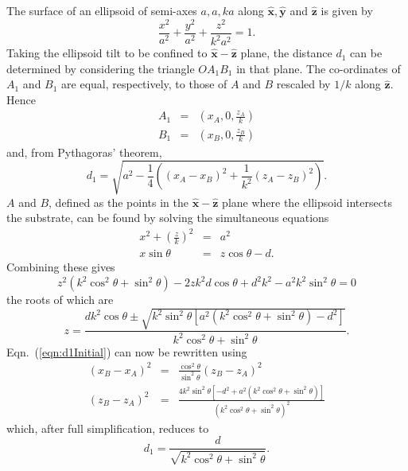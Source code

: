 \documentclass[aps,10pt,twocolumn]{revtex4}
\newcommand{\vecth}[1]{ \mathbf{\hat{#1} } }
\newcommand{\lp}{\left(}
\newcommand{\rp}{\right)}
\begin{document}
The surface of an ellipsoid of semi-axes $a,a,ka$ along $\vecth{x},\vecth{y}$ and $\vecth{z}$ is given by
\begin{equation}
    \frac{x^2}{a^2} + \frac{y^2}{a^2} + \frac{z^2}{k^2a^2} = 1 .
\end{equation}
Taking the ellipsoid tilt to be confined to $\vecth{x}-\vecth{z}$ plane, the distance $d_1$ can be determined by
considering the triangle $O A_1 B_1$ in that plane. The co-ordinates of $A_1$ and $B_1$ are equal, respectively,
to those of $A$ and $B$ rescaled by $1/k$ along $\vecth{z}$. Hence
\begin{eqnarray*}
    A_1 &=& \lp x_A, 0, \frac{z_A}{k} \rp   \\
    B_1 &=& \lp x_B, 0, \frac{z_B}{k} \rp
\end{eqnarray*}
and, from Pythagoras' theorem,
\begin{equation}
    d_1 = \sqrt{a^2 - \frac{1}{4}\lp   (x_A-x_B)^2 + \frac{1}{k^2}(z_A-z_B)^2 \rp  }  .
    \label{eqn:d1Initial}
\end{equation}
$A$ and $B$, defined as the points in the $\vecth{x}-\vecth{z}$ plane where the ellipsoid intersects the
substrate, can be found by solving the simultaneous equations
\begin{eqnarray}
        x^2+\left(\frac{z}{k}\right)^2 &=  &a^2 \\
        x \sin\theta   &=  & z\cos\theta - d .
    \label{eqn:system}
\end{eqnarray}
Combining these gives
\begin{equation}
    z^2\lp k^2\cos^2\theta + \sin^2\theta \rp - 2zk^2d\cos\theta + d^2k^2 -
    a^2k^2\sin^2\theta = 0
\end{equation}
the roots of which are
\begin{equation}
   z = \frac{dk^2\cos\theta \pm \sqrt{k^2\sin^2\theta
   \left[ a^2(k^2\cos^2\theta + \sin^2\theta) -d^2\right]}}
   {k^2\cos^2\theta + \sin^2\theta}.
\end{equation}
Eqn.~(\ref{eqn:d1Initial}) can now be rewritten using
\begin{eqnarray*}
    (x_B-x_A)^2 &=& \frac{\cos^2\theta}{\sin^2\theta}\lp z_B-z_A \rp^2  \\
    (z_B - z_A)^2 &=& \frac{4k^2\sin^2\theta
    \left[ -d^2 + a^2\lp k^2\cos^2\theta + \sin^2\theta  \rp  \right]}{(k^2\cos^2\theta + \sin^2\theta)^2}
\end{eqnarray*}
which, after full simplification, reduces to
\begin{equation}
    d_1 = \frac{d}{\sqrt{k^2\cos^2\theta + \sin^2\theta} }.
\end{equation}
\end{document}
